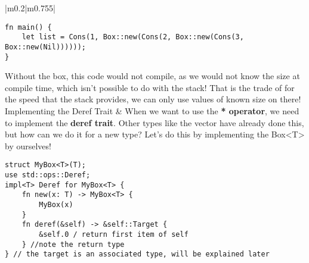 \documentclass[main.tex,fontsize=8pt,paper=a4,paper=portrait,DIV=calc,]{scrartcl}
\begin{document}
\begin{table}[ht!]
\begin{tabular}{|m{0.2\linewidth}|m{0.755\linewidth}|}
\begin{lstlisting}
fn main() {
    let list = Cons(1, Box::new(Cons(2, Box::new(Cons(3, Box::new(Nil))))));
}
\end{lstlisting}
Without the box, this code would not compile, as we would not know the size at compile time, which isn't possible to do with the stack!\newline
That is the trade of for the speed that the stack provides, we can only use values of known size on there!\\
\hline
Implementing the Deref Trait & 
When we want to use the \textbf{* operator}, we need to implement the \textbf{deref trait}.\newline
Other types like the vector have already done this, but how can we do it for a new type? \newline
Let's do this by implementing the Box<T> by ourselves!\newline
\begin{lstlisting}
struct MyBox<T>(T);
use std::ops::Deref;
impl<T> Deref for MyBox<T> {
    fn new(x: T) -> MyBox<T> {
        MyBox(x)
    }
    fn deref(&self) -> &self::Target {
        &self.0 / return first item of self
    } //note the return type
} // the target is an associated type, will be explained later
\end{lstlisting}\\
\hline
\end{tabular}
\end{table}
\pagebreak
\end{document}
